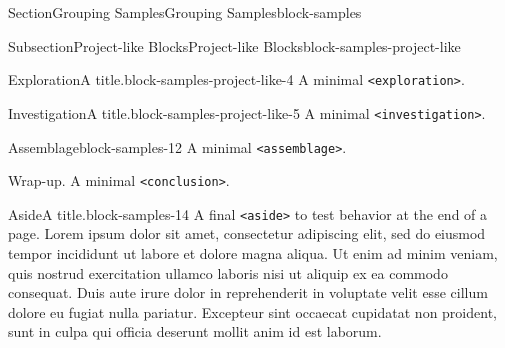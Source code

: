 \documentclass[twoside,10pt,]{article}
\newcommand{\mono}[1]{\texttt{#1}}
\numberwithin{equation}{section}
\begin{document}
\begin{sectionptx}{Section}{Grouping Samples}{}{Grouping Samples}{}{}{block-samples}
\begin{subsectionptx}{Subsection}{Project-like Blocks}{}{Project-like Blocks}{}{}{block-samples-project-like}
\begin{exploration}{Exploration}{A title.}{block-samples-project-like-4}
A minimal \mono{<exploration>}.%
\end{exploration}%
\begin{investigation}{Investigation}{A title.}{block-samples-project-like-5}%
A minimal \mono{<investigation>}.%
\end{investigation}%
\end{subsectionptx}
\begin{assemblage}{Assemblage}{}{block-samples-12}%
A minimal \mono{<assemblage>}.%
\end{assemblage}
\begin{conclusion}{Wrap-up.}%
A minimal \mono{<conclusion>}.%
\end{conclusion}%
\begin{aside}{Aside}{A title.}{block-samples-14}%
A final \mono{<aside>} to test behavior at the end of a page. Lorem ipsum dolor sit amet, consectetur adipiscing elit, sed do eiusmod tempor incididunt ut labore et dolore magna aliqua. Ut enim ad minim veniam, quis nostrud exercitation ullamco laboris nisi ut aliquip ex ea commodo consequat. Duis aute irure dolor in reprehenderit in voluptate velit esse cillum dolore eu fugiat nulla pariatur. Excepteur sint occaecat cupidatat non proident, sunt in culpa qui officia deserunt mollit anim id est laborum.%
\end{aside}
\end{sectionptx}
%
%
\typeout{************************************************}
\typeout{************************************************}
%
\end{document}

